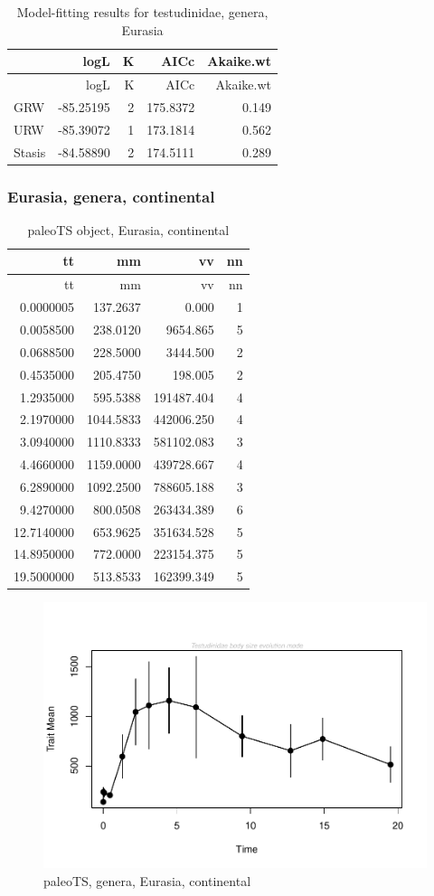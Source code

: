 \begin{longtable}[]{@{}lrrrr@{}}
	\caption{Model-fitting results for testudinidae, genera,
		Eurasia}
	\label{tab:pTSEsEM}\tabularnewline
	\toprule
	& logL & K & AICc & Akaike.wt\tabularnewline
	\midrule
	\endfirsthead
	\toprule
	& logL & K & AICc & Akaike.wt\tabularnewline
	\midrule
	\endhead
	GRW & -85.25195 & 2 & 175.8372 & 0.149\tabularnewline
	URW & -85.39072 & 1 & 173.1814 & 0.562\tabularnewline
	Stasis & -84.58890 & 2 & 174.5111 & 0.289\tabularnewline
	\bottomrule
\end{longtable}




\FloatBarrier
\subsubsection{Eurasia, genera,
	continental}\label{eurasiagenera-continental}

\begin{longtable}[]{@{}rrrr@{}}
	\caption{paleoTS object, Eurasia, continental}
	\label{tab:pTSEsC}\tabularnewline
	\toprule
	tt & mm & vv & nn\tabularnewline
	\midrule
	\endfirsthead
	\toprule
	tt & mm & vv & nn\tabularnewline
	\midrule
	\endhead
	0.0000005 & 137.2637 & 0.000 & 1\tabularnewline
	0.0058500 & 238.0120 & 9654.865 & 5\tabularnewline
	0.0688500 & 228.5000 & 3444.500 & 2\tabularnewline
	0.4535000 & 205.4750 & 198.005 & 2\tabularnewline
	1.2935000 & 595.5388 & 191487.404 & 4\tabularnewline
	2.1970000 & 1044.5833 & 442006.250 & 4\tabularnewline
	3.0940000 & 1110.8333 & 581102.083 & 3\tabularnewline
	4.4660000 & 1159.0000 & 439728.667 & 4\tabularnewline
	6.2890000 & 1092.2500 & 788605.188 & 3\tabularnewline
	9.4270000 & 800.0508 & 263434.389 & 6\tabularnewline
	12.7140000 & 653.9625 & 351634.528 & 5\tabularnewline
	14.8950000 & 772.0000 & 223154.375 & 5\tabularnewline
	19.5000000 & 513.8533 & 162399.349 & 5\tabularnewline
	\bottomrule
\end{longtable}

\begin{figure}[htbp]
	\centering
	\includegraphics{MA_JJ_files/figure-latex/pTSEsC-1.pdf}
	\caption{paleoTS, genera, Eurasia, continental}
	\label{fig:pTSEsC}
\end{figure}

